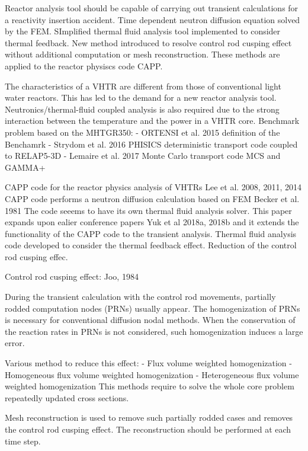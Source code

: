 
Reactor analysis tool should be capable of carrying out transient calculations for a reactivity insertion accident.
Time dependent neutron diffusion equation solved by the FEM.
SImplified thermal fluid analysis tool implemented to consider thermal feedback.
New method introduced to resolve control rod cusping effect without additional computation or mesh reconstruction.
These methods are applied to the reactor physiscs code CAPP.

The characteristics of a VHTR are different from those of conventional light water reactors.
This has led to the demand for a new reactor analysis tool.
Neutronics/thermal-fluid coupled analysis is also required due to the strong interaction between the temperature and the power in a VHTR core.
Benchmark problem based on the MHTGR350:
- ORTENSI et al. 2015
definition of the Benchamrk
- Strydom et al. 2016
PHISICS deterministic transport code coupled to RELAP5-3D
- Lemaire et al. 2017
Monte Carlo transport code MCS and GAMMA+

CAPP code for the reactor physics analysis of VHTRs
Lee et al. 2008, 2011, 2014
CAPP code performs a neutron diffusion calculation based on FEM
Becker et al. 1981
The code seeems to have its own thermal fluid analysis solver.
This paper expands upon ealier conference papers
Yuk et al 2018a, 2018b
and it extends the functionality of the CAPP code to the transient analysis.
Thermal fluid analysis code developed to consider the thermal feedback effect.
Reduction of the control rod cusping effec.

Control rod cusping effect:
Joo, 1984 %

During the transient calculation with the control rod movements, partially rodded computation nodes (PRNs) usually appear.
The homogenization of PRNs is necessary for conventional diffusion nodal methods.
When the conservation of the reaction rates in PRNs is not considered, such homogenization induces a large error.

Various method to reduce this effect:
- Flux volume weighted homogenization
- Homogeneous flux volume weighted homogenization
- Heterogeneous flux volume weighted homogenization
This methods require to solve the whole core problem repeatedly updated cross sections.

Mesh reconstruction is used to remove such partially rodded cases and removes the control rod cusping effect.
The reconstruction should be performed at each time step.

